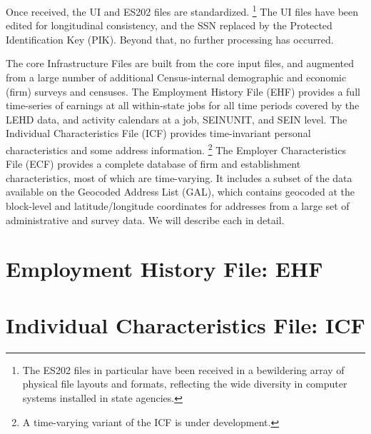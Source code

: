                       
%



Once received, the UI and ES202 files are standardized.%
%
\footnote{%
The
ES202 files in particular have been received in a bewildering array of physical file
layouts and formats, reflecting the wide diversity in computer systems
installed in state agencies.}%
%
The UI files have been edited for longitudinal
consistency, and the SSN replaced by the Protected Identification Key
(PIK). Beyond that, no further processing has occurred.

The core Infrastructure Files are built from the core input files, and
augmented from a large number of additional Census-internal demographic and
economic (firm) surveys and censuses. 
%
The Employment History File (EHF) provides a full time-series of
 earnings at all within-state jobs for all time periods covered by the
LEHD data, and activity calendars at a job, SEINUNIT, and SEIN level. 
%
The Individual Characteristics File
(ICF) provides time-invariant personal characteristics and
some address information.%
%
\footnote{A time-varying variant of the ICF is under development.}%
%
The Employer Characteristics File (ECF) provides a complete 
database of firm and establishment characteristics, most of which are
time-varying. 
%
It includes a subset of the data available on the Geocoded Address List
(GAL), which contains geocoded at the block-level  and
latitude/longitude coordinates for addresses from a large set of
administrative and survey data.
%
We will describe each in detail.


\section{Employment History File\label{cha:ehf}: EHF}


%
%

\label{sec:files}
\section{Individual Characteristics File\label{cha:icf}: ICF}


